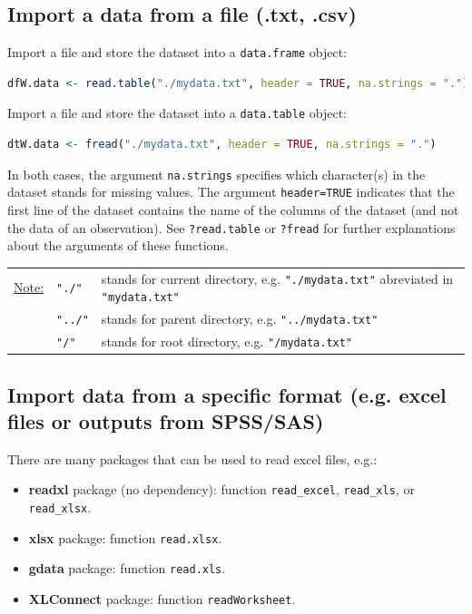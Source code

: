 \documentclass{article}
\begin{document}
\subsection{Import a data from a file (.txt, .csv)}
\label{sec:org8248526}

Import a file and store the dataset into a \texttt{data.frame} object:
\begin{lstlisting}[language=r,numbers=none]
dfW.data <- read.table("./mydata.txt", header = TRUE, na.strings = ".")
\end{lstlisting}

Import a file and store the dataset into a \texttt{data.table} object:
\begin{lstlisting}[language=r,numbers=none]
dtW.data <- fread("./mydata.txt", header = TRUE, na.strings = ".")
\end{lstlisting}

In both cases, the argument \texttt{na.strings} specifies which character(s)
in the dataset stands for missing values. The argument \texttt{header=TRUE}
indicates that the first line of the dataset contains the name of the
columns of the dataset (and not the data of an observation). See
\texttt{?read.table} or \texttt{?fread} for further explanations about the arguments
of these functions.

\bigskip

\begin{center}
\begin{tabular}{lll}
\uline{Note:} & \texttt{"./"} & stands for current directory, e.g. \texttt{"./mydata.txt"} abreviated in \texttt{"mydata.txt"}\\
 & \texttt{"../"} & stands for parent directory, e.g. \texttt{"../mydata.txt"}\\
 & \texttt{"/"} & stands for root directory, e.g. \texttt{"/mydata.txt"}\\
\end{tabular}
\end{center}
\subsection{Import data from a specific format (e.g. excel files or outputs from SPSS/SAS)}
\label{sec:org896be4a}

There are many packages that can be used to read excel files, e.g.:
\begin{itemize}
\item \textbf{readxl} package (no dependency): function \texttt{read\_excel}, \texttt{read\_xls},
or \texttt{read\_xlsx}.
\item \textbf{xlsx} package: function \texttt{read.xlsx}.
\item \textbf{gdata} package: function \texttt{read.xls}.
\item \textbf{XLConnect} package: function \texttt{readWorksheet}.
\end{itemize}
\end{document}
